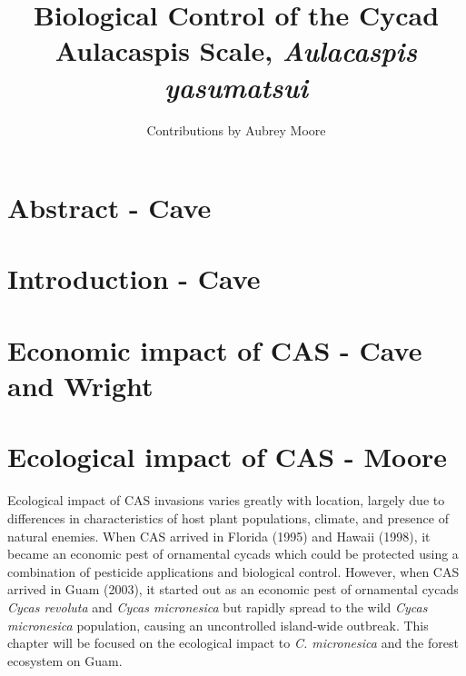 \documentclass[12pt,letterpaper,english,bibliography=totocnumbered, abstract=on]{scrartcl}
\begin{document}
	
\listoftodos

\titlehead{The latest version of this document and source files are available from \\
\url{https://github.com/aubreymoore/CAS/}}

\title{Biological Control of the Cycad Aulacaspis Scale, \textit{Aulacaspis yasumatsui}}

\author{Contributions by Aubrey Moore}

\maketitle
\newpage
\tableofcontents

\pagebreak

\section{Abstract - Cave}

\section{Introduction - Cave}

\section{Economic impact of CAS - Cave and Wright}

\section{Ecological impact of CAS - Moore}

Ecological impact of CAS invasions varies greatly with location, largely due to differences in characteristics of host plant populations, climate, and presence of natural enemies. When CAS arrived in Florida (1995) and Hawaii (1998), it became an economic pest of ornamental cycads which could be protected using a combination of pesticide applications and biological control. However, when CAS arrived in Guam (2003), it started out as an economic pest of ornamental cycads \textit{Cycas revoluta} and \textit{Cycas micronesica} but rapidly spread to the wild \textit{Cycas micronesica} population, causing an uncontrolled island-wide outbreak. This chapter will be focused on the ecological impact to \textit{C. micronesica} and the forest ecosystem on Guam.
\end{document}
